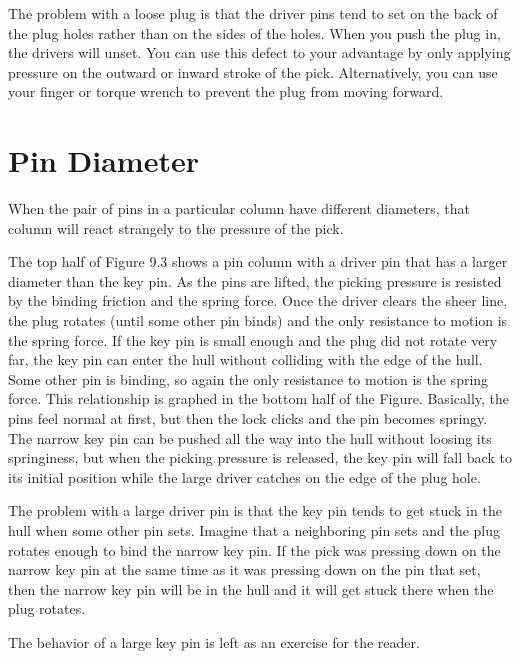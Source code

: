 The problem with a loose plug is that the driver pins tend to set on the back of the plug
holes rather than on the sides of the holes. When you push the plug in, the drivers will
unset. You can use this defect to your advantage by only applying pressure on the outward
or inward stroke of the pick. Alternatively, you can use your finger or torque wrench to
prevent the plug from moving forward.

\section{Pin Diameter}
When the pair of pins in a particular column have different diameters, that column will react
strangely to the pressure of the pick.

The top half of Figure 9.3 shows a pin column with a driver pin that has a larger diameter
than the key pin. As the pins are lifted, the picking pressure is resisted by the binding friction
and the spring force. Once the driver clears the sheer line, the plug rotates (until some other
pin binds) and the only resistance to motion is the spring force. If the key pin is small enough
and the plug did not rotate very far, the key pin can enter the hull without colliding with
the edge of the hull. Some other pin is binding, so again the only resistance to motion is the
spring force. This relationship is graphed in the bottom half of the Figure. Basically, the
pins feel normal at first, but then the lock clicks and the pin becomes springy. The narrow
key pin can be pushed all the way into the hull without loosing its springiness, but when the
picking pressure is released, the key pin will fall back to its initial position while the large
driver catches on the edge of the plug hole.

The problem with a large driver pin is that the key pin tends to get stuck in the hull
when some other pin sets. Imagine that a neighboring pin sets and the plug rotates enough
to bind the narrow key pin. If the pick was pressing down on the narrow key pin at the same
time as it was pressing down on the pin that set, then the narrow key pin will be in the hull
and it will get stuck there when the plug rotates.

The behavior of a large key pin is left as an exercise for the reader.

